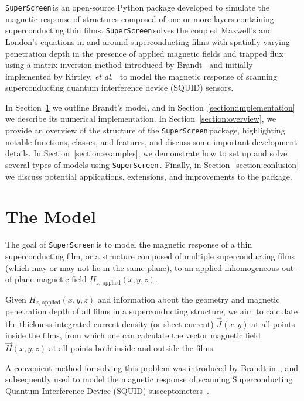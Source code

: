 \documentclass[preprint,12pt]{elsarticle}
\newcommand{\SuperScreen}{\texttt{SuperScreen}\,}
\begin{document}
\SuperScreen is an open-source Python package developed to simulate the magnetic response of structures composed of one or more layers containing superconducting thin films. \SuperScreen solves the coupled Maxwell's and London's equations in and around superconducting films with spatially-varying penetration depth in the presence of applied magnetic fields and trapped flux using a matrix inversion method introduced by Brandt~\cite{brandt_thin_2005} and initially implemented by Kirtley, \emph{et al.}~\cite{kirtley_scanning_2016, kirtley_response_2016} to model the magnetic response of scanning superconducting quantum interference device (SQUID) sensors.

In Section~\ref{section:model} we outline Brandt's model, and in Section~\ref{section:implementation} we describe its numerical implementation. In Section~\ref{section:overview}, we provide an overview of the structure of the \SuperScreen package, highlighting notable functions, classes, and features, and discuss some important development details. In Section~\ref{section:examples}, we demonstrate how to set up and solve several types of models using \SuperScreen. Finally, in Section~\ref{section:conlusion} we discuss potential applications, extensions, and improvements to the package.

\section{The Model}
\label{section:model}

The goal of \SuperScreen is to model the magnetic response of a thin superconducting film, or a structure composed of multiple superconducting films (which may or may not lie in the same plane), to an applied inhomogeneous out-of-plane magnetic field
$H_{z,\,\mathrm{applied}}(x, y, z)$.

Given $H_{z,\,\mathrm{applied}}(x, y, z)$ and information about the geometry and magnetic penetration depth of all films in a superconducting structure, we aim to calculate the thickness-integrated current density (or sheet current) $\vec{J}(x, y)$ at all points inside the films, from which one can calculate the vector magnetic field $\vec{H}(x, y, z)$ at all points both inside and outside the films.

A convenient method for solving this problem was introduced by Brandt in~\cite{brandt_thin_2005}, and subsequently used to model the magnetic response of scanning Superconducting Quantum Interference Device (SQUID) susceptometers~\cite{kirtley_scanning_2016, kirtley_response_2016}.
\end{document}
